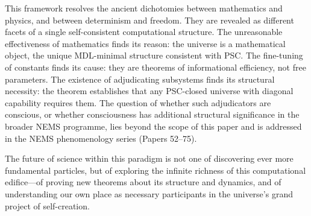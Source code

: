 \documentclass[12pt]{article}
\begin{document}
This framework resolves the ancient dichotomies between mathematics and physics, and between determinism and freedom. They are revealed as different facets of a single self-consistent computational structure. The unreasonable effectiveness of mathematics finds its reason: the universe is a mathematical object, the unique MDL-minimal structure consistent with PSC. The fine-tuning of constants finds its cause: they are theorems of informational efficiency, not free parameters. The existence of adjudicating subsystems finds its structural necessity: the theorem establishes that any PSC-closed universe with diagonal capability requires them. The question of whether such adjudicators are conscious, or whether consciousness has additional structural significance in the broader NEMS programme, lies beyond the scope of this paper and is addressed in the NEMS phenomenology series (Papers 52--75).

The future of science within this paradigm is not one of discovering ever more fundamental particles, but of exploring the infinite richness of this computational edifice—of proving new theorems about its structure and dynamics, and of understanding our own place as necessary participants in the universe's grand project of self-creation.

\appendix

\end{document}
